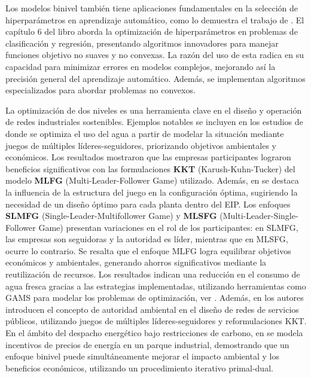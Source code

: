 Los modelos binivel también tiene aplicaciones fundamentales en la selección de hiperparámetros en aprendizaje automático, como lo demuestra el trabajo de \cite{DempeyZemkoho2020ML}. El capítulo 6 del libro aborda la optimización de hiperparámetros en problemas de clasificación y regresión, presentando algoritmos innovadores para manejar funciones objetivo no suaves y no convexas. La razón del uso de esta radica en su capacidad para minimizar errores en modelos complejos, mejorando así la precisión general del aprendizaje automático. Además, se implementan algoritmos especializados para abordar problemas no convexos.

La optimización de dos niveles es una herramienta clave en el diseño y operación de redes industriales sostenibles. Ejemplos notables se incluyen
en los estudios de \cite{Ramos2016WaterII} donde se optimiza el uso del agua a partir de modelar la situación mediante juegos de múltiples líderes-seguidores, priorizando objetivos ambientales y económicos. Los resultados mostraron que las empresas participantes lograron beneficios significativos con las formulaciones \textbf{KKT} (Karush-Kuhn-Tucker) del modelo \textbf{MLFG} (Multi-Leader-Follower Game) utilizado.
Además, en \cite{Ramos2016WaterII} se destaca la influencia de la estructura del juego en la configuración óptima, sugiriendo la necesidad de un diseño óptimo para cada planta dentro del EIP. 
Los enfoques \textbf{SLMFG} (Single-Leader-Multifollower Game) y \textbf{MLSFG} (Multi-Leader-Single-Follower Game) presentan variaciones en el rol de los participantes: en SLMFG, las empresas son seguidoras y la autoridad es líder, mientras que en MLSFG, ocurre lo contrario. Se resalta que el enfoque MLFG logra equilibrar objetivos económicos y ambientales, generando ahorros significativos mediante la reutilización de recursos. Los resultados indican una reducción en el consumo de agua fresca gracias a las estrategias implementadas, utilizando herramientas como GAMS para modelar los problemas de optimización, ver \cite{Ramos2016WaterII}. 
Además, en \cite{Ramos2018UtilityNO} los autores introducen el concepto de autoridad ambiental en el diseño de redes de servicios públicos, utilizando juegos de múltiples líderes-seguidores y reformulaciones KKT. 
En el ámbito del despacho energético bajo restricciones de carbono, en \cite{Gu2020BilevelOL} se modela incentivos de precios de energía en un parque industrial, demostrando que un enfoque binivel puede simultáneamente mejorar el impacto ambiental y los beneficios económicos, utilizando un procedimiento iterativo primal-dual.

